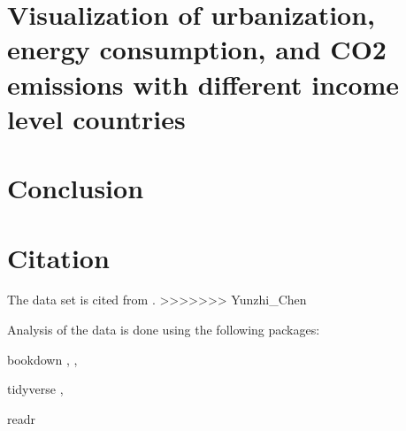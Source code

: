 \documentclass[11pt,a4paper,]{article}
\begin{document}
\clearpage

\hypertarget{visualization-of-urbanization-energy-consumption-and-co2-emissions-with-different-income-level-countries}{%
\section{Visualization of urbanization, energy consumption, and CO2 emissions with different income level countries}\label{visualization-of-urbanization-energy-consumption-and-co2-emissions-with-different-income-level-countries}}

\hypertarget{conclusion}{%
\section{Conclusion}\label{conclusion}}

\section*{Citation}

The data set is cited from \textcite{owidmeatproduction}.
>>>>>>> Yunzhi_Chen

Analysis of the data is done using the following packages:

bookdown \textcite{bookdown1}, \textcite{bookdown2},

tidyverse \textcite{tidyverse},

readr \textcite{readr}

\printbibliography
\end{document}
